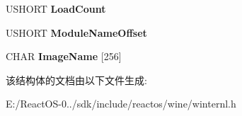\begin{DoxyCompactItemize}
\mbox{\label{struct___d_e_b_u_g___m_o_d_u_l_e___i_n_f_o_r_m_a_t_i_o_n_aa46f4ab3a3b65a22e7dd49d7680c2a1c}} 
U\+S\+H\+O\+RT {\bfseries Load\+Count}
\item 
\mbox{\label{struct___d_e_b_u_g___m_o_d_u_l_e___i_n_f_o_r_m_a_t_i_o_n_a91885d64564c9314c2575ec68d0a4c01}} 
U\+S\+H\+O\+RT {\bfseries Module\+Name\+Offset}
\item 
\mbox{\label{struct___d_e_b_u_g___m_o_d_u_l_e___i_n_f_o_r_m_a_t_i_o_n_a9c3092ed04a8ee5e59822e35b8fa5034}} 
C\+H\+AR {\bfseries Image\+Name} \mbox{[}256\mbox{]}
\end{DoxyCompactItemize}


该结构体的文档由以下文件生成\+:\begin{DoxyCompactItemize}
\item 
E\+:/\+React\+O\+S-\/0../sdk/include/reactos/wine/winternl.\+h\end{DoxyCompactItemize}
